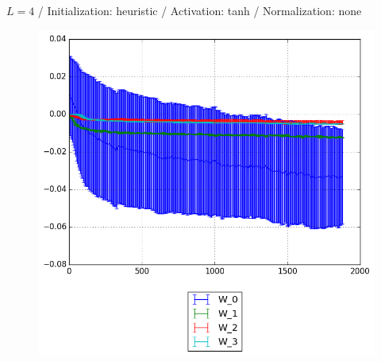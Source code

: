 \documentclass{beamer}
\begin{document}
{\begin{frame}[t]{}{}
\begin{figure}
    		\end{figure}
    		\vfill
	\end{frame}
	\begin{frame}[t]{}{}%
		\vfill
		\begin{center}
			{$L = 4$ / Initialization: heuristic / Activation: tanh / Normalization: none}
		\end{center}
    		\begin{figure}
    			\centering
    			\includegraphics[scale=0.4]{gfx/l4b32_tanh_heuristic_identity_cnn_weights}
    		\end{figure}
    		\vfill
	\end{frame}
	
}
\end{document}
